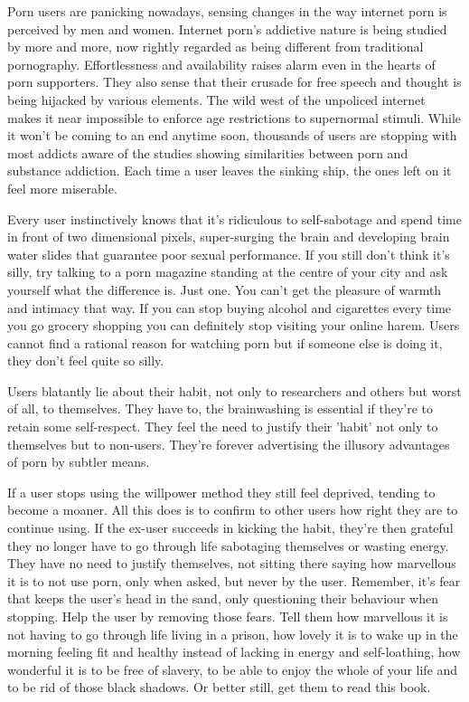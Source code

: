 \documentclass[easypeasy.tex]{subfiles}
\begin{document}
Porn users are panicking nowadays, sensing changes in the way internet porn is perceived by men and women. Internet porn's addictive nature is being studied by more and more, now rightly regarded as being different from traditional pornography. Effortlessness and availability raises alarm even in the hearts of porn supporters. They also sense that their crusade for free speech and thought is being hijacked by various elements. The wild west of the unpoliced internet makes it near impossible to enforce age restrictions to supernormal stimuli. While it won't be coming to an end anytime soon, thousands of users are stopping with most addicts aware of the studies showing similarities between porn and substance addiction. Each time a user leaves the sinking ship, the ones left on it feel more miserable.

Every user instinctively knows that it's ridiculous to self-sabotage and spend time in front of two dimensional pixels, super-surging the brain and developing brain water slides that guarantee poor sexual performance. If you still don't think it's silly, try talking to a porn magazine standing at the centre of your city and ask yourself what the difference is. Just one. You can't get the pleasure of warmth and intimacy that way. If you can stop buying alcohol and cigarettes every time you go grocery shopping you can definitely stop visiting your online harem. Users cannot find a rational reason for watching porn but if someone else is doing it, they don't feel quite so silly.

Users blatantly lie about their habit, not only to researchers and others but worst of all, to themselves. They have to, the brainwashing is essential if they're to retain some self-respect. They feel the need to justify their 'habit' not only to themselves but to non-users. They're forever advertising the illusory advantages of porn by subtler means.

If a user stops using the willpower method they still feel deprived, tending to become a moaner. All this does is to confirm to other users how right they are to continue using. If the ex-user succeeds in kicking the habit, they're then grateful they no longer have to go through life sabotaging themselves or wasting energy. They have no need to justify themselves, not sitting there saying how marvellous it is to not use porn, only when asked, but never by the user. Remember, it's fear that keeps the user's head in the sand, only questioning their behaviour when stopping. Help the user by removing those fears. Tell them how marvellous it is not having to go through life living in a prison, how lovely it is to wake up in the morning feeling fit and healthy instead of lacking in energy and self-loathing, how wonderful it is to be free of slavery, to be able to enjoy the whole of your life and to be rid of those black shadows. Or better still, get them to read this book.
\end{document}
